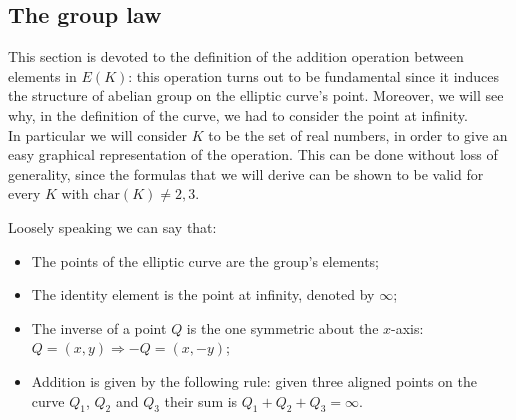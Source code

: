 \bigskip

\bigskip

\subsection{The group law}
\label{grouplaw}
This section is devoted to the definition of the addition operation between elements in $E(K)$: this operation turns out to be fundamental since it induces the structure of abelian group on the elliptic curve's point. Moreover, we will see why, in the definition of the curve, we had to consider the point at infinity.
\\
In particular we will consider $K$ to be the set of real numbers, in order to give an easy graphical representation of the operation. This can be done without loss of generality, since the formulas that we will derive can be shown to be valid for every $K$ with $\text{char}(K) \neq 2, 3$. 

\bigskip
\noindent
Loosely speaking we can say that:
\begin{itemize}
	\item The points of the elliptic curve are the group's elements;
	\item The identity element is the point at infinity, denoted by $\infty$;
	\item The inverse of a point $Q$ is the one symmetric about the $x$-axis: $Q = (x, y) \Longrightarrow -Q = (x, -y)$;
	\item Addition is given by the following rule: given three aligned points on the curve $Q_1$, $Q_2$ and $Q_3$ their sum is $Q_1 + Q_2 + Q_3 = \infty$.  
\end{itemize}


